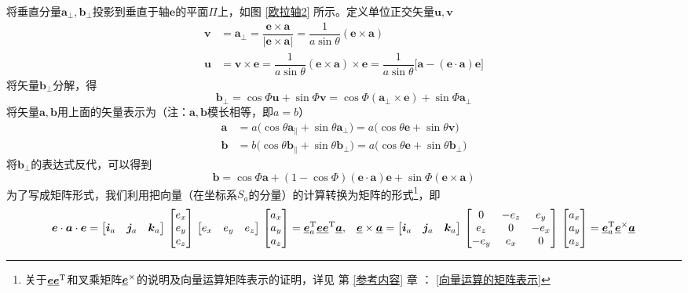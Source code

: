 将垂直分量$\bm{a}_{\perp}, \bm{b}_{\perp}$投影到垂直于轴$\bm{e}$的平面$\Pi$上，如图 \ref{欧拉轴2} 所示。定义单位正交矢量$\bm{u}, \bm{v}$
\begin{align*}
	\bm{v} & = \bm{a}_{\perp} = \dfrac{\bm{e} \times \bm{a}}{\big| \bm{e} \times \bm{a} \big|} = \dfrac{1}{a \sin \theta}(\bm{e} \times \bm{a}) \\
	\bm{u} & = \bm{v} \times \bm{e} = \dfrac{1}{a \sin \theta} (\bm{e} \times \bm{a}) \times \bm{e} = \dfrac{1}{a \sin \theta}\big[ \bm{a} - (\bm{e} \cdot \bm{a})\bm{e} \big] 
\end{align*}
将矢量$\bm{b}_{\perp}$分解，得
\begin{equation*}
	\bm{b}_{\perp} = \cos \varPhi \bm{u} + \sin \varPhi \bm{v} = \cos \varPhi (\bm{a}_\perp \times \bm{e}) + \sin \varPhi \bm{a}_\perp
\end{equation*}
将矢量$\bm{a}, \bm{b}$用上面的矢量表示为（注：$\bm{a}, \bm{b}$模长相等，即$a=b$）
\begin{align}
	\bm{a} & = a \big( \cos \theta \bm{a}_{\parallel} + \sin \theta \bm{a}_{\perp} \big) 
	= a \big( \cos \theta \bm{e} + \sin \theta \bm{v} \big) \\
	\bm{b} & = b \big( \cos \theta \bm{b}_{\parallel} + \sin \theta \bm{b}_{\perp} \big) 
	= a \big( \cos \theta \bm{e} + \sin \theta \bm{b}_{\perp} \big)
\end{align}
将$\bm{b}_{\perp}$的表达式反代，可以得到
\begin{equation}
	\bm{b} = \cos \varPhi \bm{a} + ( 1 - \cos \varPhi ) (\bm{e} \cdot \bm{a})\bm{e} + \sin \varPhi(\bm{e} \times \bm{a})
\end{equation}
为了写成矩阵形式，我们利用把向量（在坐标系$S_a$的分量）的计算转换为矩阵的形式\footnote[1]{关于$\underline{\bm{e}}\underline{\bm{e}}^{\text{T}}$和叉乘矩阵$\underline{\bm{e}}^\times$的说明及向量运算矩阵表示的证明，详见 第 \ref{参考内容} 章 ： \ref{向量运算的矩阵表示} \link[向量运算的矩阵表示]}，即
\begin{align*}
	\bm{e} \cdot \bm{a} \cdot \bm{e} = 
	\big[ \bm{i}_a \quad \bm{j}_a \quad \bm{k}_a \big] \,
	\begin{bmatrix}
		e_x \\
		e_y \\
		e_z
	\end{bmatrix}
	\,
	\big[ e_x \quad e_y \quad e_z \big]
	\,
	\begin{bmatrix}
		a_x \\
		a_y \\
		a_z
	\end{bmatrix}
	= \underline{\bm{e}}_a^{\text{T}} \underline{\bm{e}} \underline{\bm{e}}^\text{T} \underline{\bm{a}},
	&& \underline{\bm{e}} \times \underline{\bm{a}} =
	\big[ \bm{i}_a \quad \bm{j}_a \quad \bm{k}_a \big] \,
	\begin{bmatrix}
		0 & -e_z & e_y \\
		e_z & 0 & -e_x \\
		-e_y & e_x & 0
	\end{bmatrix}
	\,
	\begin{bmatrix}
		a_x \\
		a_y \\
		a_z
	\end{bmatrix}
	= \underline{\bm{e}}_a^{\text{T}} \underline{\bm{e}}^\times \underline{\bm{a}}
\end{align*}
